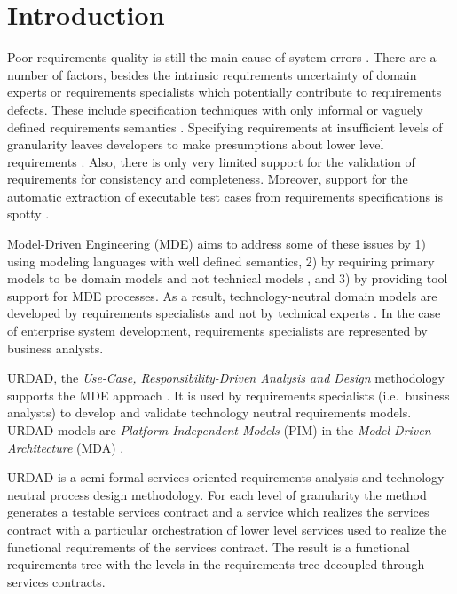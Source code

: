 \section{Introduction}

Poor requirements quality is still the main cause of system errors \cite{heck_experiences_2008,_strategies_2011}. There are a number of factors, besides the intrinsic requirements uncertainty of domain experts or requirements specialists which potentially contribute to requirements defects. These include specification techniques with only informal or vaguely defined requirements semantics \cite{ferguson_empirical_2006}. Specifying requirements at insufficient levels of granularity leaves developers to make presumptions about lower level requirements \cite{espana_evaluating_2009, getBetterReference}. Also, there is only very limited support for the validation of requirements for consistency and completeness. Moreover, support for the automatic extraction of executable test cases from requirements specifications is spotty \cite{bashardoust-tajali_extracting_2008}.

Model-Driven Engineering (MDE) \cite{schmidt_model_2006} aims to address some of these issues by 1) using modeling languages with well defined semantics, 2) by requiring primary models to be domain models and not technical models \cite{asnina_computation_2010}, and 3) by providing tool support for MDE processes. As a result, technology-neutral domain models are developed by requirements specialists and not by technical experts \cite{asnina_computation_2010}. In the case of enterprise system development, requirements specialists are represented by business analysts.

URDAD, the {\em Use-Case, Responsibility-Driven Analysis and Design} \cite{fritz_solms_technology_2007} methodology supports the MDE approach \cite{solms_urdad_2010}. It is used by requirements specialists (i.e.\ business analysts) to develop and validate technology neutral requirements models. URDAD models are {\em Platform Independent Models} (PIM) in the {\em Model Driven Architecture} (MDA) \cite{solms_urdad_2010}.

URDAD is a semi-formal services-oriented requirements analysis and tech\-no\-logy-neutral process design methodology. For each level of granularity the method generates a testable services contract and a service which realizes the services contract with a particular orchestration of lower level services used to realize the functional requirements of the services contract. The result is a functional requirements tree with the levels in the requirements tree decoupled through services contracts.

